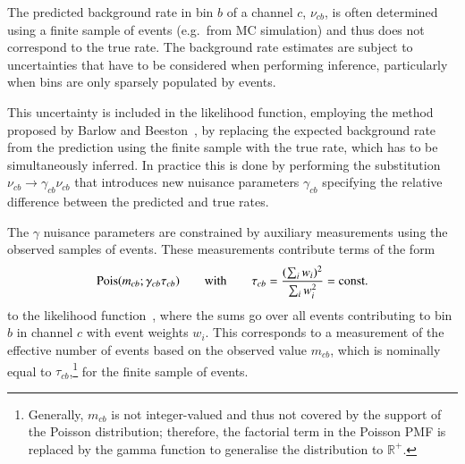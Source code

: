 The predicted background rate in bin $b$ of a channel $c$, $\nu_{cb}$, is often
determined using a finite sample of events (e.g.\ from MC simulation) and thus
does not correspond to the true rate. The background rate estimates are subject
to uncertainties that have to be considered when performing inference,
particularly when bins are only sparsely populated by events.

This uncertainty is included in the likelihood function, employing the method
proposed by Barlow and Beeston~\cite{barlow1993}, by replacing the expected
background rate from the prediction using the finite sample with the true rate,
which has to be simultaneously inferred. In practice this is done by performing
the substitution $\nu_{cb} \rightarrow \gamma_{cb} \nu_{cb}$ that introduces new
nuisance parameters $\gamma_{cb}$ specifying the relative difference between the
predicted and true rates.

The $\gamma$ nuisance parameters are constrained by auxiliary measurements using
the observed samples of events. These measurements contribute terms of the form
\begin{align*}
  \operatorname{Pois}(m_{cb} ; \gamma_{cb} \tau_{cb})
  \qquad \text{with} \qquad
  \tau_{cb} = \frac{( \sum_i w_i )^2}{\sum_i w_i^2} = \text{const.}
\end{align*}
to the likelihood function~\cite{cranmer2012}, where the sums go over all events
contributing to bin $b$ in channel $c$ with event weights $w_i$. This
corresponds to a measurement of the effective number of events based on the
observed value $m_{cb}$, which is nominally equal to
$\tau_{cb}$,\footnote{Generally, $m_{cb}$ is not integer-valued and thus not
  covered by the support of the Poisson distribution; therefore, the factorial
  term in the Poisson PMF is replaced by the gamma function to generalise the
  distribution to $\mathbb{R}^+$.} for the finite sample of events.

